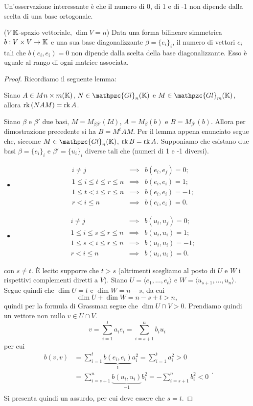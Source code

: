 \documentclass{article}     %
\newcommand{\gln}[2]{\mathpzc{Gl}_{#1}(#2)}
\begin{document}
Un'osservazione interessante è che il numero di 0, di 1 e di -1 non dipende dalla scelta di una base ortogonale.
\begin{shadedTheorem}[Rango]
    ($V$ $\mathbb{K}$-spazio vettoriale, $\dim V=n$) Data una forma bilineare simmetrica $b:V\times V \to \mathbb{K}$ e una sua base diagonalizzante $\beta=\{e_i\}_i$, il numero di vettori $e_i$ tali che $b(e_i,e_i)=0$ non dipende dalla scelta della base diagonalizzante. Esso è uguale al rango di ogni matrice associata.
\end{shadedTheorem}
\begin{proof}
    Ricordiamo il seguente lemma:
    \begin{lemma}
        Siano $A\in M{n\times m}(\mathbb{K})$, $N\in \gln{n}{\K}$ e $M\in \gln{m}{\K}$, allora $\operatorname{rk}\left( NAM \right)=\operatorname{rk} A$.
    \end{lemma}
    Siano $\beta$ e $\beta'$ due basi, $M=M_{\beta\beta'}(Id)$, $A=M_\beta(b)$ e $B=M_{\beta'}(b)$. Allora per dimostrazione precedente si ha $B=M^tAM$. Per il lemma appena enunciato segue che, siccome $M\in \gln{n}{\K}$, $\operatorname{rk} B=\operatorname{rk} A$.
    Supponiamo che esistano due basi $\beta=\{e_i\}_i$ e $\beta'=\{u_i\}_i$ diverse tali che (numeri di 1 e -1 diversi).
    \begin{itemize}
        \item \[\begin{array}{rcl}
            i\neq j & \implies  &b(e_i,e_j)=0;\\
            1\leq i\leq t\leq r\leq n &\implies &b(e_i,e_i)=1;\\
            1\leq t< i\leq r\leq n &\implies &b(e_i,e_i)=-1;\\
            r<i\leq n& \implies & b(e_i,e_i)=0.
        \end{array}\]
        \item \[\begin{array}{rcl}
            i\neq j & \implies  &b(u_i,u_j)=0;\\
            1\leq i\leq s\leq r\leq n &\implies &b(u_i,u_i)=1;\\
            1\leq s< i\leq r\leq n &\implies &b(u_i,u_i)=-1;\\
            r<i\leq n& \implies & b(u_i,u_i)=0.
        \end{array}\]
    \end{itemize}
    con $s\neq t$. È lecito supporre che $t>s$ (altrimenti scegliamo al posto di $U$ e $W$ i rispettivi complementi diretti a $V$). Siano $U=\langle e_1, \dots, e_t\rangle$ e $W=\langle u_{s+1},\dots, u_n\rangle$. Segue quindi che $\dim U=t$ e $\dim W=n-s$, da cui 
    \[\dim U+\dim W=n-s+t>n,\]
    quindi per la formula di Grassman segue che $\dim U\cap V>0$. Prendiamo quindi un vettore non nullo $v\in U\cap V$.
    \[v=\sum_{i=1}^ta_ie_i=\sum_{i=s+1}^nb_iu_i\] 
    per cui
    \[\begin{aligned}
        b(v,v)&=\sum_{i=1}^t\underbrace{b(e_i,e_i)}_1a_i^2= \sum_{i=1}^ta_i^2>0\\
        &=\sum_{i=s+1}^n\underbrace{b(u_i,u_i)}_{-1}b_i^2= -\sum_{i=s+1}^nb_i^2<0\\
    \end{aligned}.\]
    Si presenta quindi un assurdo, per cui deve essere che $s=t$.
\end{proof}
\end{document}
